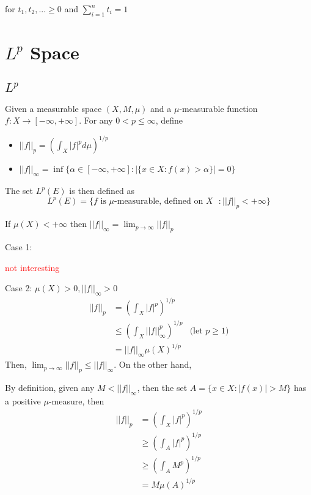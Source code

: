 \documentclass{report}
\begin{document}
for $t_1, t_2, ... \geq 0$ and $\sum_{i=1}^n t_i = 1$

\chapter{$L^p$ Space}

\section{$L^p$}

\begin{definition}[$L^p$]
    Given a measurable space $(X, M, \mu)$ and a $\mu$-measurable function $f: X \to [-\infty, +\infty]$. For any $0 < p \leq \infty$, define
    \begin{itemize}
        \item $||f||_p = \left( \int_X |f|^p d\mu \right)^{1/p}$
        \item $||f||_\infty = \inf \{ \alpha \in [-\infty, +\infty]: |\{x \in X: f(x) > \alpha \}| = 0 \}$
    \end{itemize}
    The set $L^p(E)$ is then defined as
    \[
        L^p(E) = \{ f \text{ is $\mu$-measurable, defined on $X$ }: ||f||_p < +\infty \}
    \]
\end{definition}

\begin{proposition}
    If $\mu(X) < +\infty$ then $||f||_\infty = \lim_{p \to \infty} ||f||_p$ 
\end{proposition}

Case 1: 

\textcolor{red}{not interesting}

Case 2: $\mu(X) > 0, ||f||_\infty > 0$
\begin{align*}
    ||f||_p
    &= \left(\int_X |f|^p \right)^{1/p} \\
    &\leq \left(\int_X ||f||_\infty^p \right)^{1/p} &\text{(let $p \geq 1$)}\\
    &= ||f||_\infty \mu(X)^{1/p}
\end{align*}
Then, $\lim_{p \to \infty} ||f||_p \leq ||f||_\infty$. On the other hand,

By definition, given any $M < ||f||_\infty$, then the set $A = \{ x \in X: |f(x)| > M \}$ has a positive $\mu$-measure, then 
\begin{align*}
    ||f||_p
    &= \left(\int_X |f|^p \right)^{1/p} \\
    &\geq \left(\int_A |f|^p \right)^{1/p} \\
    &\geq \left(\int_A M^p \right)^{1/p} \\
    &= M \mu(A)^{1/p}
\end{align*}
\end{document}
